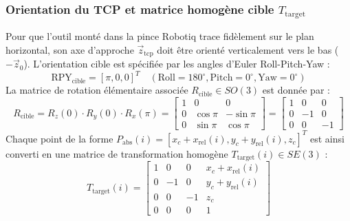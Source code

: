 \documentclass[11pt,a4paper]{report}
\begin{document}
\subsubsection{Orientation du TCP et matrice homogène cible $T_{\text{target}}$}
Pour que l'outil monté dans la pince Robotiq trace fidèlement sur le plan horizontal, son axe d'approche $\vec{z}_{\text{tcp}}$ doit être orienté verticalement vers le bas ($-\vec{z}_0$). L'orientation cible est spécifiée par les angles d'Euler Roll-Pitch-Yaw :
\begin{equation}
    \text{RPY}_{\text{cible}} = [\pi, 0, 0]^T \quad (\text{Roll} = 180^\circ, \text{Pitch} = 0^\circ, \text{Yaw} = 0^\circ)
\end{equation}
La matrice de rotation élémentaire associée $R_{\text{cible}} \in SO(3)$ est donnée par :
\begin{equation}
    R_{\text{cible}} = R_z(0) \cdot R_y(0) \cdot R_x(\pi) = \begin{bmatrix} 1 & 0 & 0 \\ 0 & \cos\pi & -\sin\pi \\ 0 & \sin\pi & \cos\pi \end{bmatrix} = \begin{bmatrix} 1 & 0 & 0 \\ 0 & -1 & 0 \\ 0 & 0 & -1 \end{bmatrix}
\end{equation}
Chaque point de la forme $P_{\text{abs}}(i) = [x_c + x_{\text{rel}}(i), y_c + y_{\text{rel}}(i), z_c]^T$ est ainsi converti en une matrice de transformation homogène $T_{\text{target}}(i) \in SE(3)$ :
\begin{equation}
    T_{\text{target}}(i) = \begin{bmatrix} 1 & 0 & 0 & x_c + x_{\text{rel}}(i) \\ 0 & -1 & 0 & y_c + y_{\text{rel}}(i) \\ 0 & 0 & -1 & z_c \\ 0 & 0 & 0 & 1 \end{bmatrix}
\end{equation}
\end{document}

